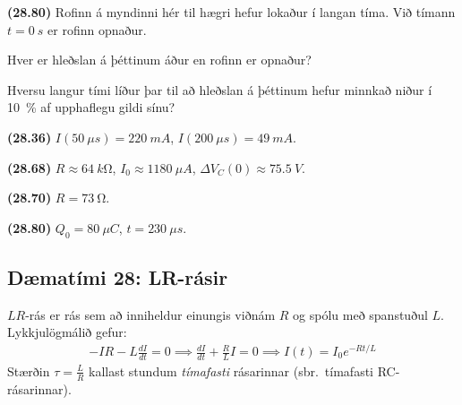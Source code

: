 \begin{enumerate}[label = \textbf{(\alph*)}]
\begin{minipage}{\linewidth}
\item[\textbf{(28.80)}] Rofinn á myndinni hér til hægri hefur lokaður í langan tíma. Við tímann $t = \SI{0}{s}$ er rofinn opnaður.  \begin{enumerate*}[label = \textbf{(\alph*)}]
    \item Hver er hleðslan á þéttinum áður en rofinn er opnaður?
    \item Hversu langur tími líður þar til að hleðslan á þéttinum hefur minnkað niður í \SI{10}{\percent} af upphaflegu gildi sínu?
\end{enumerate*}

\end{minipage}

\end{enumerate}

\vspace{2cm}

\begin{tcolorbox}
\begin{enumerate*}[label = ]
  \item \textbf{(28.36)} $I(\SI{50}{\mu s}) = \SI{220}{mA}$, $I(\SI{200}{\mu s}) = \SI{49}{mA}$.
  \item \textbf{(28.68)} $R \approx \SI{64}{k\ohm}$, $I_0 \approx \SI{1180}{\mu A}$, $\Delta V_C(0) \approx \SI{75.5}{V}$.
  \item \textbf{(28.70)} $R = \SI{73}{\ohm}$.
  \item \textbf{(28.80)} $Q_0 = \SI{80}{\mu C}$, $t = \SI{230}{\mu s}$.
\end{enumerate*}
\end{tcolorbox}

\newpage

\subsection*{Dæmatími 28: LR-rásir}

\begin{tcolorbox}
$LR$-rás er rás sem að inniheldur einungis viðnám $R$ og spólu með spanstuðul $L$. Lykkjulögmálið gefur:
\begin{align*}
    - IR - L\frac{dI}{dt} = 0 \implies \frac{dI}{dt} + \frac{R}{L} I = 0 \implies I(t) = I_0e^{-Rt/L}
\end{align*}
Stærðin $\tau = \frac{L}{R}$ kallast stundum \emph{tímafasti} rásarinnar (sbr.~tímafasti RC-rásarinnar).
\end{tcolorbox}

